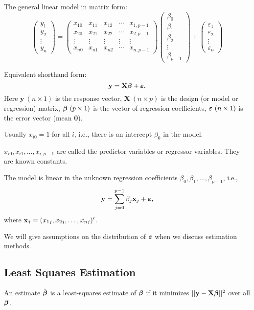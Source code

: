 The general linear model in matrix form:
$$
\left( \begin{array}{c} y_1 \\ y_2 \\ \vdots \\ y_n \end{array} \right) =
\left( \begin{array}{ccccc}
x_{10} & x_{11} & x_{12} & \cdots & x_{1,p-1} \\ 
x_{20} & x_{21} & x_{22} & \cdots & x_{2,p-1} \\ 
\vdots & \vdots & \vdots & \vdots & \vdots \\ 
x_{n0} & x_{n1} & x_{n2} & \cdots & x_{n,p-1}
\end{array} \right)
\left(\begin{array}{c}\beta_0\\\beta_1\\\beta_2\\\vdots\\\beta_{p-1}
	\end{array}\right) +
\left(\begin{array}{c}\varepsilon_1\\\varepsilon_2\\\vdots\\\varepsilon_n
	\end{array}\right) 
$$

\vb

Equivalent shorthand form:
$$
\mathbf{y=X\mbox{\boldmath $\beta$} + \mbox{\boldmath $\varepsilon$}}.
$$
Here
$\mathbf{y}\ (n\times 1)$ is the response vector, 
$\mathbf{X}\ (n\times p)$ is the design (or model or regression) matrix, 
$\mbox{\boldmath $\beta$}\ (p\times 1)$ is the vector of regression coefficients, 
$\mbox{\boldmath $\varepsilon$}\ (n\times 1)$ is the error vector (mean {\bf 0}).


\bnote
Usually $x_{i0}=1$ for all $i$, i.e., there is an intercept $\beta _0$
in the model.
\esnote

\bsnote
$x_{i0},x_{i1},\ldots,x_{i,p-1}$ are called the predictor variables or
regressor variables. They are known constants.
\esnote

\bsnote
The model is linear in the unknown regression coefficients
$\beta_0,\beta_1,\ldots,\beta_{p-1}$, i.e.,
$$
{\bf y} = \sum_{j=0}^{p-1} \beta_j {\bf x}_j + \mbox{\boldmath $\varepsilon$},
$$
where ${\bf x}_j=(x_{1j},x_{2j},\ldots,x_{nj})'$.
\esnote

\bsnote
We will give assumptions on the distribution of $\mbox{\boldmath $\varepsilon$}$ when we
discuss estimation methods.
\esnote

\vb
\subsection{Least Squares Estimation}
\bdefi
An estimate $\hat{\mbox{\boldmath $\beta$}}$ is a least-squares estimate of $\mbox{\boldmath $\beta$}$ if
it minimizes $||\mathbf{y} - \mathbf{X}\mbox{\boldmath $\beta$}||^2$ over all $\mbox{\boldmath $\beta$}$.
\esdefi

